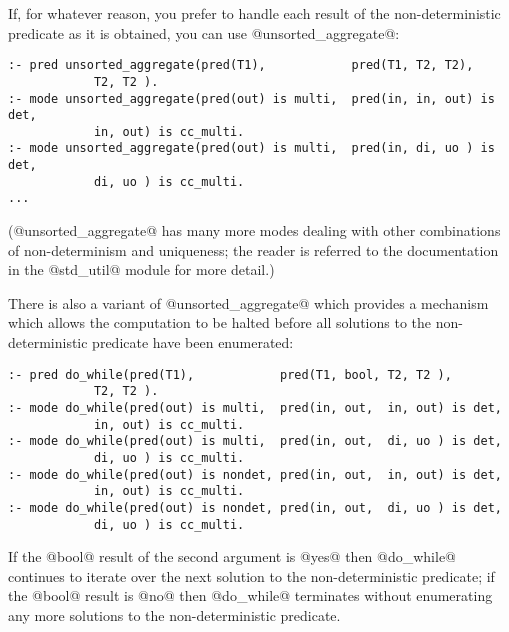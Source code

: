 If, for whatever reason, you prefer to handle each result of the
non-deterministic predicate as it is obtained, you can use
@unsorted\_aggregate@:
\begin{verbatim}
:- pred unsorted_aggregate(pred(T1),            pred(T1, T2, T2),
            T2, T2 ).
:- mode unsorted_aggregate(pred(out) is multi,  pred(in, in, out) is det,
            in, out) is cc_multi.
:- mode unsorted_aggregate(pred(out) is multi,  pred(in, di, uo ) is det,
            di, uo ) is cc_multi.
...
\end{verbatim}
(@unsorted\_aggregate@ has many more modes dealing with other
combinations of non-determinism and uniqueness; the reader is referred
to the documentation in the @std\_util@ module for more detail.)

There is also a variant of @unsorted\_aggregate@ which provides a
mechanism which allows the computation to be halted before all solutions
to the non-deterministic predicate have been enumerated:
\begin{verbatim}
:- pred do_while(pred(T1),            pred(T1, bool, T2, T2 ),
            T2, T2 ).
:- mode do_while(pred(out) is multi,  pred(in, out,  in, out) is det,
            in, out) is cc_multi.
:- mode do_while(pred(out) is multi,  pred(in, out,  di, uo ) is det,
            di, uo ) is cc_multi.
:- mode do_while(pred(out) is nondet, pred(in, out,  in, out) is det,
            in, out) is cc_multi.
:- mode do_while(pred(out) is nondet, pred(in, out,  di, uo ) is det,
            di, uo ) is cc_multi.
\end{verbatim}
If the @bool@ result of the second argument is @yes@ then @do\_while@
continues to iterate over the next solution to the non-deterministic
predicate; if the @bool@ result is @no@ then @do\_while@ terminates
without enumerating any more solutions to the non-deterministic
predicate.  


